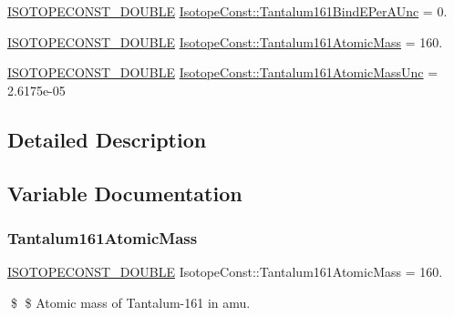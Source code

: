 \begin{DoxyCompactItemize}
\mbox{\hyperlink{group___isotope_const-_macros_ga8f45a7272ce02c0b4c65c44636ed719a}{I\+S\+O\+T\+O\+P\+E\+C\+O\+N\+S\+T\+\_\+\+D\+O\+U\+B\+LE}} \mbox{\hyperlink{group___isotope_const-_tantalum-_ta161_ga4954b0a88c735718d32f08c50120e2c0}{Isotope\+Const\+::\+Tantalum161\+Bind\+E\+Per\+A\+Unc}} = 0.
\item 
\mbox{\hyperlink{group___isotope_const-_macros_ga8f45a7272ce02c0b4c65c44636ed719a}{I\+S\+O\+T\+O\+P\+E\+C\+O\+N\+S\+T\+\_\+\+D\+O\+U\+B\+LE}} \mbox{\hyperlink{group___isotope_const-_tantalum-_ta161_gadffd087763d02c1bd6083730ede18c7a}{Isotope\+Const\+::\+Tantalum161\+Atomic\+Mass}} = 160.
\item 
\mbox{\hyperlink{group___isotope_const-_macros_ga8f45a7272ce02c0b4c65c44636ed719a}{I\+S\+O\+T\+O\+P\+E\+C\+O\+N\+S\+T\+\_\+\+D\+O\+U\+B\+LE}} \mbox{\hyperlink{group___isotope_const-_tantalum-_ta161_ga2d850ffe0c827ac6dda02d2bca1fb3a0}{Isotope\+Const\+::\+Tantalum161\+Atomic\+Mass\+Unc}} = 2.\+6175e-\/05
\end{DoxyCompactItemize}


\subsection{Detailed Description}


\subsection{Variable Documentation}
\mbox{\label{group___isotope_const-_tantalum-_ta161_gadffd087763d02c1bd6083730ede18c7a}} 
\subsubsection{\texorpdfstring{Tantalum161\+Atomic\+Mass}{Tantalum161AtomicMass}}
{\footnotesize\ttfamily \mbox{\hyperlink{group___isotope_const-_macros_ga8f45a7272ce02c0b4c65c44636ed719a}{I\+S\+O\+T\+O\+P\+E\+C\+O\+N\+S\+T\+\_\+\+D\+O\+U\+B\+LE}} Isotope\+Const\+::\+Tantalum161\+Atomic\+Mass = 160.}

\$ \$ Atomic mass of Tantalum-\/161 in amu. \mbox{\label{group___isotope_const-_tantalum-_ta161_ga2d850ffe0c827ac6dda02d2bca1fb3a0}} 
